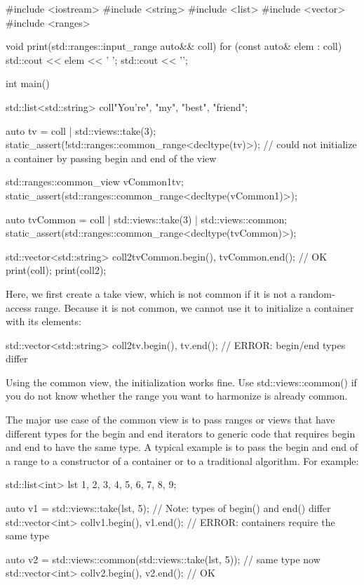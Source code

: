 \begin{cpp}
#include <iostream>
#include <string>
#include <list>
#include <vector>
#include <ranges>

void print(std::ranges::input_range auto&& coll)
{
	for (const auto& elem : coll) {
		std::cout << elem << ' ';
	}
	std::cout << '\n';
}

int main()
{
	std::list<std::string> coll{"You're", "my", "best", "friend"};
	
	auto tv = coll | std::views::take(3);
	static_assert(!std::ranges::common_range<decltype(tv)>);
	// could not initialize a container by passing begin and end of the view
	
	std::ranges::common_view vCommon1{tv};
	static_assert(std::ranges::common_range<decltype(vCommon1)>);
	
	auto tvCommon = coll | std::views::take(3) | std::views::common;
	static_assert(std::ranges::common_range<decltype(tvCommon)>);
	
	std::vector<std::string> coll2{tvCommon.begin(), tvCommon.end()}; // OK
	print(coll);
	print(coll2);
}
\end{cpp}

Here, we first create a take view, which is not common if it is not a random-access range. Because it is not common, we cannot use it to initialize a container with its elements:

\begin{cpp}
std::vector<std::string> coll2{tv.begin(), tv.end()}; // ERROR: begin/end types differ
\end{cpp}

Using the common view, the initialization works fine. Use std::views::common() if you do not know whether the range you want to harmonize is already common.

The major use case of the common view is to pass ranges or views that have different types for the begin and end iterators to generic code that requires begin and end to have the same type. A typical example is to pass the begin and end of a range to a constructor of a container or to a traditional algorithm. For example:

\begin{cpp}
std::list<int> lst {1, 2, 3, 4, 5, 6, 7, 8, 9};

auto v1 = std::views::take(lst, 5); // Note: types of begin() and end() differ
std::vector<int> coll{v1.begin(), v1.end()}; // ERROR: containers require the same type

auto v2 = std::views::common(std::views::take(lst, 5)); // same type now
std::vector<int> coll{v2.begin(), v2.end()}; // OK
\end{cpp}

